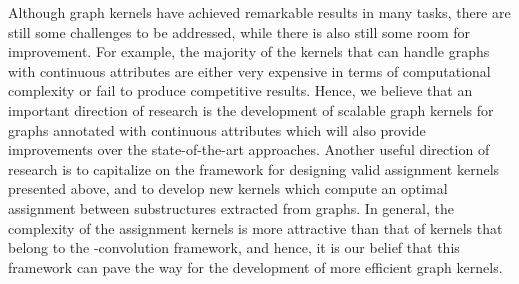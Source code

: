 \documentclass[twoside,11pt]{article}
\begin{document}
Although graph kernels have achieved remarkable results in many tasks, there are still some challenges to be addressed, while there is also still some room for improvement.
For example, the majority of the kernels that can handle graphs with continuous attributes are either very expensive in terms of computational complexity or fail to produce competitive results.
Hence, we believe that an important direction of research is the development of scalable graph kernels for graphs annotated with continuous attributes which will also provide improvements over the state-of-the-art approaches.
Another useful direction of research is to capitalize on the framework for designing valid assignment kernels presented above, and to develop new kernels which compute an optimal assignment between substructures extracted from graphs.
In general, the complexity of the assignment kernels is more attractive than that of kernels that belong to the -convolution framework, and hence, it is our belief that this framework can pave the way for the development of more efficient graph kernels.

\vskip 0.2in


\end{document}

